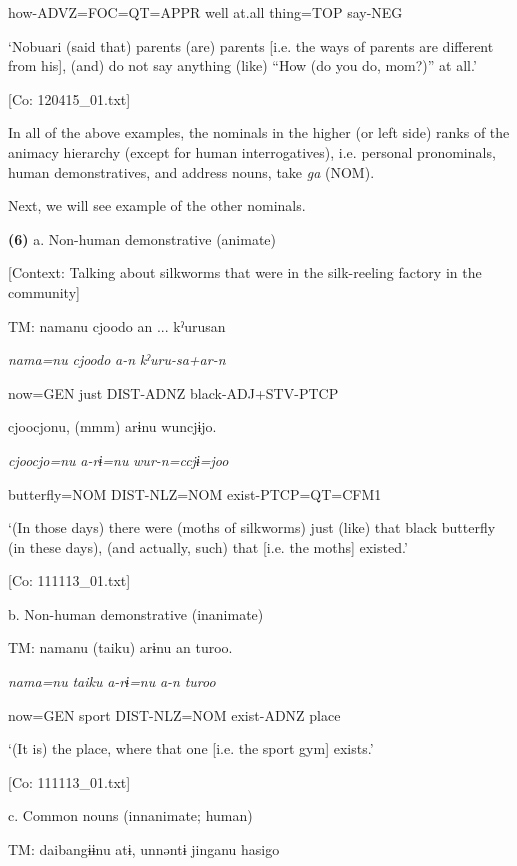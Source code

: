       how-ADVZ=FOC=QT=APPR  well  at.all  thing=TOP  say-NEG

      ‘Nobuari (said that) parents (are) parents [i.e. the ways of parents are different from his], (and) do not say anything (like) “How (do you do, mom?)” at all.’

      [Co: 120415\_01.txt]

In all of the above examples, the nominals in the higher (or left side) ranks of the animacy hierarchy (except for human interrogatives), i.e. personal pronominals, human demonstratives, and address nouns, take \textit{ga} (NOM).

  Next, we will see example of the other nominals.

\textbf{(6)}  a.  Non-human demonstrative (animate)

    [Context: Talking about silkworms that were in the silk-reeling factory in the community]

    TM:  namanu  cjoodo  an ...  kˀurusan

      \textit{nama=nu}  \textit{cjoodo}  \textit{a-n}  \textit{kˀuru-sa+ar-n}

      now=GEN  just  DIST-ADNZ  black-ADJ+STV-PTCP

      cjoocjonu,  (mmm)  arɨnu  wuncjɨjo.

      \textit{cjoocjo=nu}    \textit{a-rɨ=nu}  \textit{wur-n=ccjɨ=joo}

      butterfly=NOM    DIST-NLZ=NOM  exist-PTCP=QT=CFM1

      ‘(In those days) there were (moths of silkworms) just (like) that black butterfly (in these days), (and actually, such) that [i.e. the moths] existed.’

      [Co: 111113\_01.txt]

  b.  Non-human demonstrative (inanimate)

    TM:  namanu  ({\textbar}taiku{\textbar})  arɨnu  an  turoo.

      \textit{nama=nu}  \textit{taiku}  \textit{a-rɨ=nu}  \textit{a-n}  \textit{turoo}

      now=GEN  sport  DIST-NLZ=NOM  exist-ADNZ  place

      ‘(It is) the place, where that one [i.e. the sport gym] exists.’

      [Co: 111113\_01.txt]

  c.  Common nouns (innanimate; human)

    TM:  daibangɨɨnu  atɨ,  unnəntɨ  jinganu  {\textbar}hasigo{\textbar}

